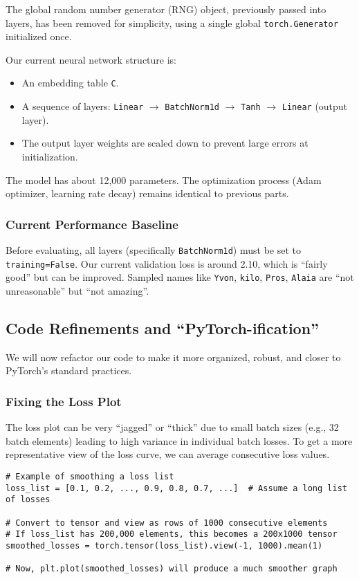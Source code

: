 The global random number generator (RNG) object, previously passed into layers, has been removed for simplicity, using a single global \texttt{torch.Generator} initialized once.

Our current neural network structure is:
\begin{itemize}
    \item An embedding table \texttt{C}.
    \item A sequence of layers: \texttt{Linear} $\rightarrow$ \texttt{BatchNorm1d} $\rightarrow$ \texttt{Tanh} $\rightarrow$ \texttt{Linear} (output layer).
    \item The output layer weights are scaled down to prevent large errors at initialization.
\end{itemize}
The model has about 12,000 parameters. The optimization process (Adam optimizer, learning rate decay) remains identical to previous parts.

\subsubsection{Current Performance Baseline}
Before evaluating, all layers (specifically \texttt{BatchNorm1d}) must be set to \texttt{training=False}. Our current validation loss is around 2.10, which is ``fairly good'' but can be improved. Sampled names like \texttt{Yvon}, \texttt{kilo}, \texttt{Pros}, \texttt{Alaia} are ``not unreasonable'' but ``not amazing''.

\subsection{Code Refinements and ``PyTorch-ification''}

We will now refactor our code to make it more organized, robust, and closer to PyTorch's standard practices.

\subsubsection{Fixing the Loss Plot}
The loss plot can be very ``jagged'' or ``thick'' due to small batch sizes (e.g., 32 batch elements) leading to high variance in individual batch losses. To get a more representative view of the loss curve, we can average consecutive loss values.

\begin{lstlisting}[caption={Example of smoothing a loss list}]
# Example of smoothing a loss list
loss_list = [0.1, 0.2, ..., 0.9, 0.8, 0.7, ...]  # Assume a long list of losses

# Convert to tensor and view as rows of 1000 consecutive elements
# If loss_list has 200,000 elements, this becomes a 200x1000 tensor
smoothed_losses = torch.tensor(loss_list).view(-1, 1000).mean(1)

# Now, plt.plot(smoothed_losses) will produce a much smoother graph
\end{lstlisting}

